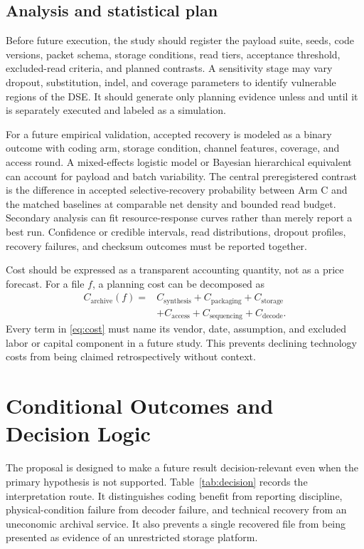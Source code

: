 \documentclass[conference]{IEEEtran}
\begin{document}
\subsection{Analysis and statistical plan}

Before future execution, the study should register the payload suite, seeds, code versions, packet schema, storage conditions, read tiers, acceptance threshold, excluded-read criteria, and planned contrasts. A sensitivity stage may vary dropout, substitution, indel, and coverage parameters to identify vulnerable regions of the DSE. It should generate only planning evidence unless and until it is separately executed and labeled as a simulation.

For a future empirical validation, accepted recovery is modeled as a binary outcome with coding arm, storage condition, channel features, coverage, and access round. A mixed-effects logistic model or Bayesian hierarchical equivalent can account for payload and batch variability. The central preregistered contrast is the difference in accepted selective-recovery probability between Arm C and the matched baselines at comparable net density and bounded read budget. Secondary analysis can fit resource-response curves rather than merely report a best run. Confidence or credible intervals, read distributions, dropout profiles, recovery failures, and checksum outcomes must be reported together.

Cost should be expressed as a transparent accounting quantity, not as a price forecast. For a file $f$, a planning cost can be decomposed as
\begin{align}
C_{\mathrm{archive}}(f)={}&C_{\mathrm{synthesis}}+C_{\mathrm{packaging}}+C_{\mathrm{storage}} \nonumber\\
&+C_{\mathrm{access}}+C_{\mathrm{sequencing}}+C_{\mathrm{decode}}.
\label{eq:cost}
\end{align}
Every term in \eqref{eq:cost} must name its vendor, date, assumption, and excluded labor or capital component in a future study. This prevents declining technology costs from being claimed retrospectively without context.

\section{Conditional Outcomes and Decision Logic}

The proposal is designed to make a future result decision-relevant even when the primary hypothesis is not supported. Table~\ref{tab:decision} records the interpretation route. It distinguishes coding benefit from reporting discipline, physical-condition failure from decoder failure, and technical recovery from an uneconomic archival service. It also prevents a single recovered file from being presented as evidence of an unrestricted storage platform.
\end{document}
